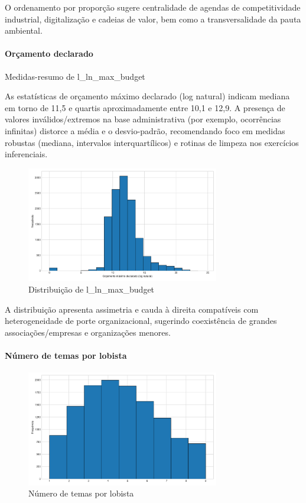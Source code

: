 O ordenamento por proporção sugere centralidade de agendas de competitividade industrial, digitalização e cadeias de valor, bem como a transversalidade da pauta ambiental.

\paragraph{Orçamento declarado}
\begin{table}[!htbp]
\centering
\caption{Medidas-resumo de l\_ln\_max\_budget}

\end{table}

As estatísticas de orçamento máximo declarado (log natural) indicam mediana em torno de 11,5 e quartis aproximadamente entre 10,1 e 12,9. A presença de valores inválidos/extremos na base administrativa (por exemplo, ocorrências infinitas) distorce a média e o desvio-padrão, recomendando foco em medidas robustas (mediana, intervalos interquartílicos) e rotinas de limpeza nos exercícios inferenciais.

\begin{figure}[!htbp]
\centering
\includegraphics[width=0.75\textwidth]{figures/budget_ln_hist.png}
\caption{Distribuição de l\_ln\_max\_budget}
\end{figure}

A distribuição apresenta assimetria e cauda à direita compatíveis com heterogeneidade de porte organizacional, sugerindo coexistência de grandes associações/empresas e organizações menores.

\paragraph{Número de temas por lobista}
\begin{figure}[!htbp]
\centering
\includegraphics[width=0.75\textwidth]{figures/themes_per_lobbyist_hist.png}
\caption{Número de temas por lobista}
\end{figure}

